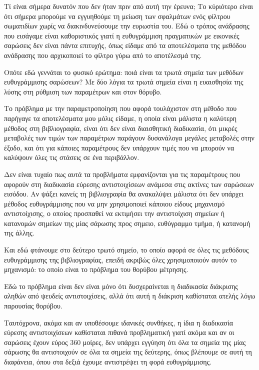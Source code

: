 \documentclass[a4paper,10pt]{article}
\begin{document}
Τί είναι σήμερα δυνατόν που δεν ήταν πριν από αυτή την έρευνα; Το κύριότερο
είναι ότι σήμερα μπορούμε να εγγυηθούμε τη μείωση των σφαλμάτων ενός φίλτρου
σωματιδίων χωρίς να διακινδυνεύσουμε την ευρωστία του. Εδώ ο τρόπος ανάδρασης
που εισάγαμε είναι καθοριστικός γιατί η ευθυγράμμιση πραγματικών με εικονικές
σαρώσεις δεν είναι πάντα επιτυχής, όπως είδαμε από τα αποτελέσματα της μεθόδου
ανάδρασης που αρχικοποιεί το φίλτρο γύρω από το αποτέλεσμά της.

Οπότε εδώ γεννάται το φυσικό ερώτημα: ποιά είναι τα τρωτά σημεία των μεθόδων
ευθυγράμμισης σαρώσεων? Με δύο λόγια τα τρωτά σημεία είναι η ευαισθησία της
λύσης στη ρύθμιση των παραμέτρων και στον θόρυβο.

Το πρόβλημα με την παραμετροποίηση που αφορά τουλάχιστον στη μέθοδο που
παρήγαγε τα αποτελέσματα μου μόλις είδαμε, η οποία είναι μάλιστα η καλύτερη
μέθοδος στη βιβλιογραφία, είναι ότι δεν είναι διαισθητική διαδικασία, ότι
μικρές μεταβολές των τιμών των παραμέτρων παράγουν δυσανάλογα μεγάλες μεταβολές
στην έξοδο, και ότι για κάποιες παραμέτρους δεν υπάρχουν τιμές που να μπορούν
να καλύψουν όλες τις στάσεις σε ένα περιβάλλον.

Δεν είναι τυχαίο πως αυτά τα προβλήματα εμφανίζονται για τις παραμέτρους που
αφορούν στη διαδικασία εύρεσης αντιστοιχίσεων ανάμεσα στις ακτίνες των σαρώσεων
εισόδου. Αν ψάξει κανείς τη βιβλιογραφία θα ανακαλύψει μάλιστα ότι δεν υπάρχει
μέθοδος ευθυγράμμισης που να μην χρησιμοποιεί κάποιου είδους μηχανισμό
αντιστοίχισης, ο οποίος προσπαθεί να εκτιμήσει την αντιστοίχιση σημείων ή
κατανομών σημείων της μίας σάρωσης προς σημειο, ευθύγραμμο τμήμα, ή κατανομή
της άλλης.

Και εδώ φτάνουμε στο δεύτερο τρωτό σημείο, το οποίο αφορά σε όλες τις μεθόδους
ευθυγράμμισης της βιβλιογραφίας, επειδή ακριβώς όλες χρησιμοποιούν αυτόν το
μηχανισμό: το οποίο είναι το πρόβλημα του θορύβου μέτρησης.

Εδώ το πρόβλημα είναι δεν είναι μόνο ότι δυσχεραίνεται η διαδικασία διάκρισης
αληθών από ψευδείς αντιστοιχίσεις, αλλά ότι αυτή η διάκριση καθίσταται ατελής
λόγω παρουσίας θορύβου.

Ταυτόχρονα, ακόμα και αν υποθέσουμε ιδανικές συνθήκες, η ίδια η διαδικασία
εύρεσης αντιστοιχίσεων καθίσταται πιθανά προβληματική γιατί ακόμα και αν οι
σαρώσεις έχουν εύρος 360 μοίρες, δεν υπάρχει εγγύηση ότι όλα τα σημεία της μίας
σάρωσης θα αντιστοιχούν σε όλα τα σημεία της δεύτερης, όπως βλέπουμε σε αυτή τη
διαφάνεια, όπου στα δεξιά έχουμε αντιστρέψει τη φορά ευθυγράμμισης.
\end{document}
